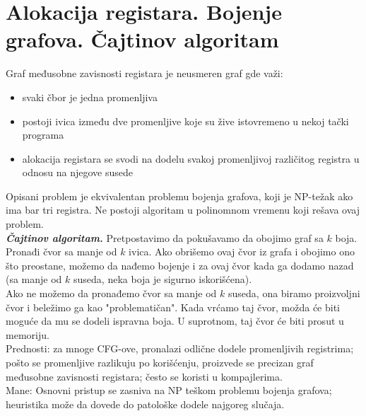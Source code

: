 \documentclass[10pt]{extarticle}
\begin{document}
\section{Alokacija registara. Bojenje grafova. Čajtinov algoritam}
\noindent
Graf međusobne zavisnosti registara je neusmeren graf gde važi:
\begin{itemize}
    \item svaki čbor je jedna promenljiva
    \item postoji ivica između dve promenljive koje su žive istovremeno u nekoj tački programa
    \item alokacija registara se svodi na dodelu svakoj promenljivoj različitog registra u odnosu na njegove susede
\end{itemize}
Opisani problem je ekvivalentan problemu bojenja grafova, koji je NP-težak ako ima bar tri registra. Ne postoji algoritam u polinomnom vremenu koji rešava ovaj problem.\\
\textit{\textbf{Čajtinov algoritam.}} Pretpostavimo da pokušavamo da obojimo graf sa $k$ boja. Pronađi čvor sa manje od $k$ ivica. Ako obrišemo ovaj čvor iz grafa i obojimo ono što preostane, možemo da nađemo bojenje i za ovaj čvor kada ga dodamo nazad (sa manje od $k$ suseda, neka boja je sigurno iskorišćena).\\
Ako ne možemo da pronađemo čvor sa manje od $k$ suseda, ona biramo proizvoljni čvor i beležimo ga kao "problematičan". Kada vrćamo taj čvor, možda će biti moguće da mu se dodeli ispravna boja. U suprotnom, taj čvor će biti prosut u memoriju.\\
Prednosti: za mnoge CFG-ove, pronalazi odlične dodele promenljivih registrima; pošto se promenljive razlikuju po korišćenju, proizvede se precizan graf međusobne zavisnosti registara; često se koristi u kompajlerima.\\
Mane: Osnovni pristup se zasniva na NP teškom problemu bojenja grafova; heuristika može da dovede do patološke dodele najgoreg slučaja.
\newpage
\end{document}
